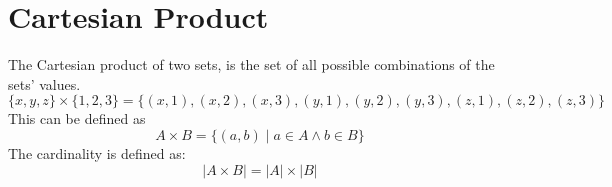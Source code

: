 \section{Cartesian Product}\label{sec:cartesian_productpafive}

The Cartesian product of two sets, is the set of all possible combinations of the sets' values.
\[
    \{x, y, z\} \times \{1, 2, 3\} = \{(x, 1), (x, 2), (x, 3), (y, 1), (y, 2), (y, 3), (z, 1), (z, 2), (z, 3)\}
\]
This can be defined as
\[
    A \times B = \{(a, b)  \mid a \in A \land b \in B\}
\]
The cardinality is defined as:
\[
    |A\times B| = |A| \times  |B|
\]

